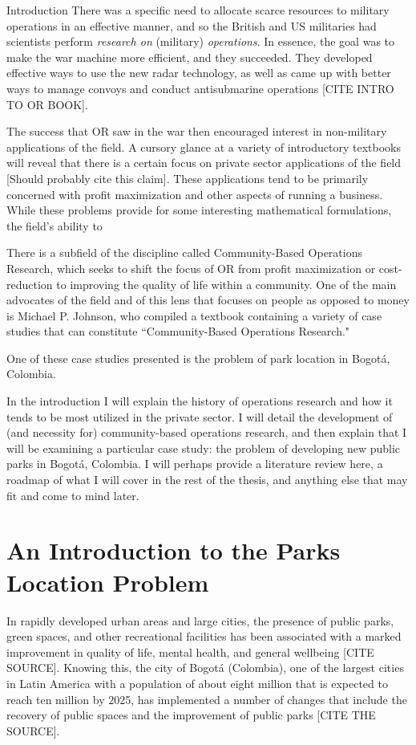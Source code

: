 \documentclass[12pt]{pom_thesis}
\begin{document}
\begin{chapter}{Introduction}
	There was a specific need to allocate scarce resources to military operations in an effective manner, and so the British and US militaries had scientists perform \textit{research on} (military) \textit{operations}. In essence, the goal was to make the war machine more efficient, and they succeeded. They developed effective ways to use the new radar technology, as well as came up with better ways to manage convoys and conduct antisubmarine operations [CITE INTRO TO OR BOOK]. 
	
	The success that OR saw in the war then encouraged interest in non-military applications of the field.
	A cursory glance at a variety of introductory textbooks will reveal that there is a certain focus on private sector applications of the field [Should probably cite this claim]. These applications tend to be primarily concerned with profit maximization and other aspects of running a business. While these problems provide for some interesting mathematical formulations, the field's ability to 
	
	There is a subfield of the discipline called Community-Based Operations Research, which seeks to shift the focus of OR from profit maximization or cost-reduction to improving the quality of life within a community. One of the main advocates of the field and of this lens that focuses on people as opposed to money is Michael P. Johnson, who compiled a textbook containing a variety of case studies that can constitute ``Community-Based Operations Research." 
	
	One of these case studies presented is the problem of park location in Bogot\'{a}, Colombia.

In the introduction I will explain the history of operations research and how it tends to be most utilized in the private sector. I will detail the development of (and necessity for) community-based operations research, and then explain that I will be examining a particular case study: the problem of developing new public parks in Bogot\'a, Colombia. I will perhaps provide a literature review here, a roadmap of what I will cover in the rest of the thesis, and anything else that may fit and come to mind later.

\section{An Introduction to the Parks Location Problem}

	In rapidly developed urban areas and large cities, the presence of public parks, green spaces, and other recreational facilities has been associated with a marked improvement in quality of life, mental health, and general wellbeing [CITE SOURCE]. Knowing this, the city of Bogot\'{a} (Colombia), one of the largest cities in Latin America with a population of about eight million that is expected to reach ten million by 2025, has implemented a number of changes that include the recovery of public spaces and the improvement of public parks [CITE THE SOURCE]. 
	

\end{chapter}
\end{document}
